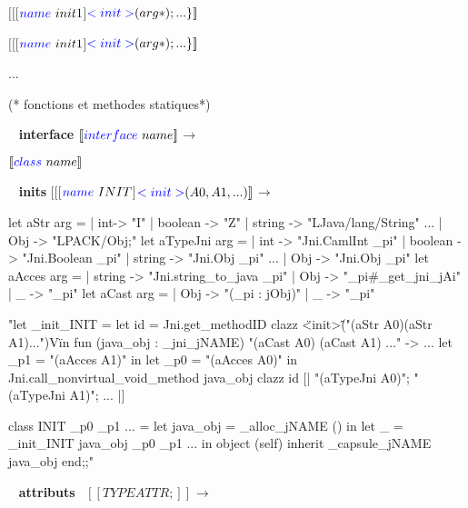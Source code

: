 \documentclass[a4paper, 11pt]{report}
\begin{document}
$[\![$[$ {\color{blue}name}\ init1 $]${\color{blue} <init>} (arg*); ...\}
]\!]$

$[\![$[$ {\color{blue}name}\ init1 $]${\color{blue} <init>} (arg*); ...\}
]\!]$

...
\begin{OCaml}
(* fonctions et  methodes statiques*)


\end{OCaml}

\newpage
\
\newline
\textbf{ interface }
\newline
\noindent
$[\![{\color{blue}interface}\  name ]\!]$$\longrightarrow$
% 

$[\![{\color{blue}class}\  name ]\!]_{}$

\ 
\newline
\noindent
\textbf{ inits }
\newline
\noindent
$[\![$[$ {\color{blue}name}\ INIT $]${\color{blue} <init>} (A0,
    A1, ...)]\!]_{}$$\longrightarrow$
% 

\begin{OCaml}

let aStr arg =
   | int-> "I"
   | boolean -> "Z"
   | string -> "LJava/lang/String"
     ...
   | Obj -> "LPACK/Obj;"
let aTypeJni arg =
   | int -> "Jni.CamlInt _pi"
   | boolean -> "Jni.Boolean _pi"
   | string -> "Jni.Obj _pi"
     ...
   | Obj -> "Jni.Obj _pi"
let aAcces arg =
  | string -> "Jni.string_to_java _pi"
  | Obj -> "_pi#_get_jni_jAi"
  |  _ -> "_pi"
let aCast arg =
  | Obj -> "(_pi : jObj)"
  |  _ -> "_pi"

\end{OCaml}

\begin{OCaml}
"let _init_INIT =
  let id = Jni.get_methodID clazz \"<init>\" 
            \"("(aStr A0)(aStr A1)...")V\"
  in
    fun (java_obj : _jni_jNAME) "(aCast A0) (aCast A1) ..." -> 
      ...
      let _p1 = "(aAcces A1)" in
      let _p0 = "(aAcces A0)" in
      Jni.call_nonvirtual_void_method java_obj clazz id 
          [| "(aTypeJni A0)"; "(aTypeJni A1)"; ... |]

class INIT _p0 _p1 ... =
  let java_obj = _alloc_jNAME ()
  in let _ = _init_INIT java_obj _p0 _p1 ...
    in object (self) inherit _capsule_jNAME java_obj 
end;;"

\end{OCaml}
\ 
\newline
\noindent
\textbf{ attributs }
\newline
\noindent
\ 
$[\![ TYPE ATTR; ]\!]_{}$$\longrightarrow$
\end{document}

